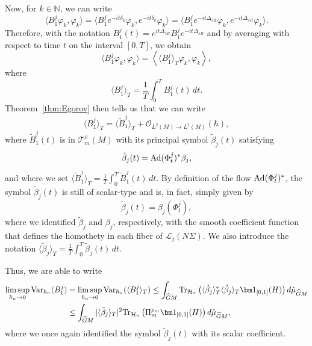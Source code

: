 \documentclass[12pt,a4paper]{amsart}
\theoremstyle{plain}
\theoremstyle{definition}
\theoremstyle{remark}
\numberwithin{equation}{section}
\theoremstyle{definition}
\def\N{{\mathbb N}}%
\def \O{\mathscr{O}}
\def \Ghat{\widehat{G}}
\numberwithin{equation}{section}
\begin{document}
Now, for $k\in\N$, we can write
\begin{equation*}
    \langle B_1^j \varphi_k,\varphi_k\rangle = \langle B_1^j e^{-it \delta_k}\varphi_k, e^{-it \delta_k}\varphi_k\rangle = \langle B_1^j e^{-it\Delta_{sR}}\varphi_k,e^{-it\Delta_{sR}}\varphi_k\rangle.
\end{equation*}
Therefore, with the notation $B_1^j(t) = e^{it\Delta_{sR}}B_1^j e^{-it\Delta_{sR}}$ and by averaging with respect to time $t$ on the interval $[0,T]$, we obtain
\begin{equation*}
    \langle B_1^j \varphi_k,\varphi_k\rangle =  \left\langle \langle B_1^j\rangle_T\varphi_k,\varphi_k\right\rangle,
\end{equation*}
where 
\begin{equation*}
    \langle B_1^j\rangle_T = \frac{1}{T}\int_{0}^T B_1^j(t)\,dt.
\end{equation*}
Theorem~\ref{thm:Egorov} then tells us that we can write
\begin{equation*}
    \langle B_1^j \rangle_T = \langle \tilde{B}_1^j \rangle_T + \O_{L^2(M)\rightarrow L^2(M)}(\hbar),
\end{equation*}
where $\tilde{B}_1^j(t)$ is in $\mathcal{T}_m^\rho(M)$ with its principal symbol $\tilde{\beta}_j(t)$ satisfying 
\begin{equation*}
    \tilde{\beta}_j(t) = {\rm Ad}(\Phi_t^j)^*\beta_j,
\end{equation*}
and where we set $\langle \tilde{B}_1^j\rangle_T = \frac{1}{T}\int_0^T \tilde{B}_1^j(t)\,dt$. By definition of the flow ${\rm Ad}(\Phi_t^j)^*$, the symbol $\tilde{\beta}_j(t)$ is still of scalar-type and is, in fact, simply given by
\begin{equation*}
    \tilde{\beta}_j(t) = \beta_j(\Phi_t^j),
\end{equation*}
where we identified $\tilde{\beta}_j$ and $\beta_j$, respectively, with the smooth coefficient function that defines the homothety in each fiber of $\mathcal{L}_j(N\Sigma)$. We also introduce the notation $\langle \tilde{\beta}
_j\rangle_T = \frac{1}{T}\int_0^T \tilde{\beta}_j(t)\,dt$.
    
Thus, we are able to write
\begin{equation*}
    \begin{aligned}
    \limsup_{\hbar_n\rightarrow 0}{\rm Var}_{\hbar_n}(B_1^j) 
    &= \limsup_{\hbar_n\rightarrow 0}{\rm Var}_{\hbar_n}(\langle B_1^j\rangle_T)\leq \int_{\Ghat M}{\rm Tr}_{\mathcal{H}_\pi}\left(\langle \tilde{\beta}_j\rangle_T^*\langle \tilde{\beta}_j\rangle_T{\bm 1}_{[0,1]}(H)\right)d\hat{\mu}_{\Ghat M}\\
    &\leq\int_{\Ghat M} |\langle \tilde{\beta}_j\rangle_T|^2{\rm Tr}_{\mathcal{H}_\pi}\left(\Pi_m^{\rho_m}{\bm 1}_{[0,1]}(H)\right)d\hat{\mu}_{\Ghat M},
    \end{aligned}
\end{equation*}
where we once again identified the symbol $\tilde{\beta}_j(t)$ with its scalar coefficient. 
\end{document}
